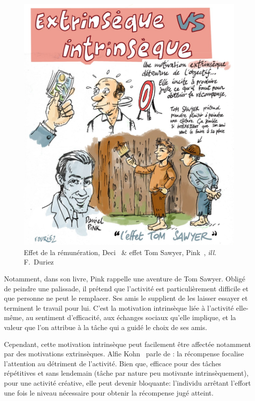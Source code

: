 \begin{figure}[!h]
\begin{minipage}{0.475\linewidth}
        \includegraphics[width=\linewidth]{Figures/Duriez-motiv2.jpg}
        \caption[Effet de la rémunération, Deci~ \& effet Tom Sawyer, Pink~]{Effet de la rémunération, Deci~ \& effet Tom Sawyer, Pink~, \textit{ill.} F.~Duriez~}
        \label{fig:motiv2}
    \end{minipage}
    \end{figure}\par%
    Notamment, dans son livre, Pink rappelle une aventure de Tom Sawyer. Obligé de peindre une palissade, il prétend que l'activité est particulièrement difficile et que personne ne peut le remplacer. Ses amis le supplient de les laisser essayer et terminent le travail pour lui.
    C'est la motivation intrinsèque liée à l'activité elle-même, au sentiment d'efficacité, aux échanges sociaux qu'elle implique, \etc et la valeur que l'on attribue à la tâche qui a guidé le choix de ses amis.\par%
    Cependant, cette motivation intrinsèque peut facilement être affectée notamment par des motivations extrinsèques. Alfie Kohn~ parle de : la récompense focalise l'attention au détriment de l'activité. Bien que, efficace pour des tâches répétitives et sans lendemain (tâche par nature peu motivante intrinsèquement), pour une activité créative, elle peut devenir bloquante: l'individu arrêtant l'effort une fois le niveau nécessaire pour obtenir la récompense jugé atteint.\par%
